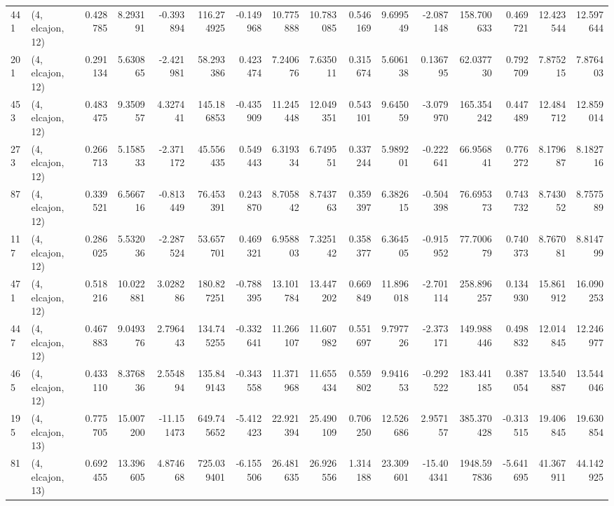 \begin{tabular}{llrrrrrrrrrrrrrr}
441 &  (4, elcajon, 12) &   0.428785 &   8.293191 &  -0.393894 &   116.274925 &  -0.149968 &  10.775888 &  10.783085 &  0.546169 &   9.699549 &  -2.087148 &    158.700633 &    0.469721 &   12.423544 &   12.597644 \\
201 &  (4, elcajon, 12) &   0.291134 &   5.630865 &  -2.421981 &    58.293386 &   0.423474 &   7.240676 &   7.635011 &  0.315674 &   5.606138 &   0.136795 &     62.037730 &    0.792709 &    7.875215 &    7.876403 \\
453 &  (4, elcajon, 12) &   0.483475 &   9.350957 &   4.327441 &   145.186853 &  -0.435909 &  11.245448 &  12.049351 &  0.543101 &   9.645059 &  -3.079970 &    165.354242 &    0.447489 &   12.484712 &   12.859014 \\
273 &  (4, elcajon, 12) &   0.266713 &   5.158533 &  -2.371172 &    45.556435 &   0.549443 &   6.319334 &   6.749551 &  0.337244 &   5.989201 &  -0.222641 &     66.956841 &    0.776272 &    8.179687 &    8.182716 \\
87  &  (4, elcajon, 12) &   0.339521 &   6.566716 &  -0.813449 &    76.453391 &   0.243870 &   8.705842 &   8.743763 &  0.359397 &   6.382615 &  -0.504398 &     76.695373 &    0.743732 &    8.743052 &    8.757589 \\
117 &  (4, elcajon, 12) &   0.286025 &   5.532036 &  -2.287524 &    53.657701 &   0.469321 &   6.958803 &   7.325142 &  0.358377 &   6.364505 &  -0.915952 &     77.700679 &    0.740373 &    8.767081 &    8.814799 \\
471 &  (4, elcajon, 12) &   0.518216 &  10.022881 &   3.028286 &   180.827251 &  -0.788395 &  13.101784 &  13.447202 &  0.669849 &  11.896018 &  -2.701114 &    258.896257 &    0.134930 &   15.861912 &   16.090253 \\
447 &  (4, elcajon, 12) &   0.467883 &   9.049376 &   2.796443 &   134.745255 &  -0.332641 &  11.266107 &  11.607982 &  0.551697 &   9.797726 &  -2.373171 &    149.988446 &    0.498832 &   12.014845 &   12.246977 \\
465 &  (4, elcajon, 12) &   0.433110 &   8.376836 &   2.554894 &   135.849143 &  -0.343558 &  11.371968 &  11.655434 &  0.559802 &   9.941653 &  -0.292522 &    183.441185 &    0.387054 &   13.540887 &   13.544046 \\
195 &  (4, elcajon, 13) &   0.775705 &  15.007200 & -11.151473 &   649.745652 &  -5.412423 &  22.921394 &  25.490109 &  0.706250 &  12.526686 &   2.957157 &    385.370428 &   -0.313515 &   19.406845 &   19.630854 \\
81  &  (4, elcajon, 13) &   0.692455 &  13.396605 &   4.874668 &   725.039401 &  -6.155506 &  26.481635 &  26.926556 &  1.314188 &  23.309601 & -15.404341 &   1948.597836 &   -5.641695 &   41.367911 &   44.142925 \\

\end{tabular}
